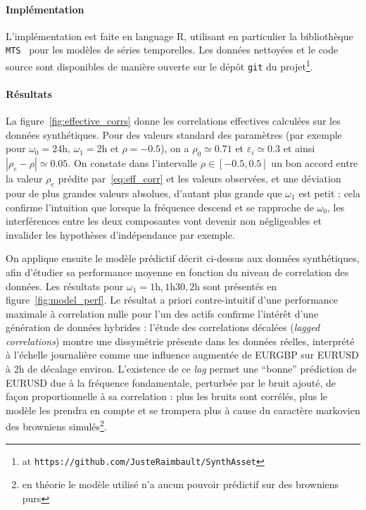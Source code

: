 \paragraph{Implémentation}

L'implémentation est faite en language R, utilisant en particulier la bibliothèque \texttt{MTS}~\cite{Tsay:2015xy} pour les modèles de séries temporelles. Les données nettoyées et le code source sont disponibles de manière ouverte sur le dépôt \texttt{git} du projet\footnote{at \texttt{https://github.com/JusteRaimbault/SynthAsset}}.

\paragraph{Résultats}

La figure~\ref{fig:effective_corrs} donne les correlations effectives calculées sur les données synthétiques. Pour des valeurs standard des paramètres (par exemple pour $\omega_0=24\textrm{h}$, $\omega_1=2\textrm{h}$ et $\rho=-0.5$), on a $\rho_0\simeq 0.71$ et $\varepsilon_i \simeq 0.3$ et ainsi $\left| \rho_e - \rho \right|\simeq 0.05$. On constate dans l'intervalle $\rho \in [-0.5,0.5]$ un bon accord entre la valeur $\rho_e$ prédite par~\ref{eq:eff_corr} et les valeurs observées, et une déviation pour de plus grandes valeurs absolues, d'autant plus grande que $\omega_1$ est petit : cela confirme l'intuition que lorsque la fréquence descend et se rapproche de $\omega_0$, les interférences entre les deux composantes vont devenir non négligeables et invalider les hypothèses d'indépendance par exemple.

On applique ensuite le modèle prédictif décrit ci-dessus aux données synthétiques, afin d'étudier sa performance moyenne en fonction du niveau de correlation des données. Les résultats pour $\omega_1 = 1\textrm{h},1\textrm{h}30,2\textrm{h}$ sont présentés en figure~\ref{fig:model_perf}. Le résultat a priori contre-intuitif d'une performance maximale à correlation nulle pour l'un des actifs confirme l'intérêt d'une génération de données hybrides : l'étude des correlations décalées (\emph{lagged correlations}) montre une dissymétrie présente dans les données réelles, interprété à l'échelle journalière comme une influence augmentée de EURGBP sur EURUSD à 2h de décalage environ. L'existence de ce \emph{lag} permet une ``bonne'' prédiction de EURUSD due à la fréquence fondamentale, perturbée par le bruit ajouté, de façon proportionnelle à sa correlation : plus les bruits sont corrélés, plus le modèle les prendra en compte et se trompera plus à cause du caractère markovien des browniens simulés\footnote{en théorie le modèle utilisé n'a aucun pouvoir prédictif sur des browniens purs}.

